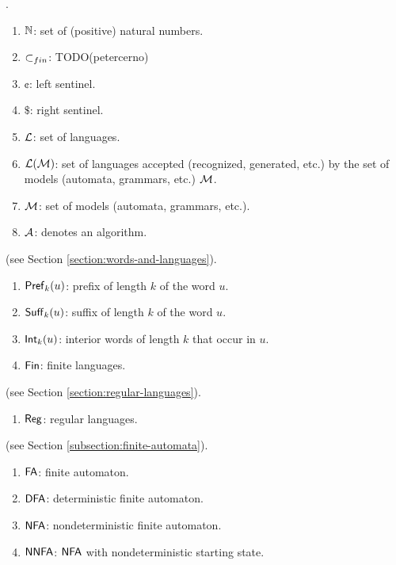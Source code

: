
.

\begin{enumerate}[]
\item $\mathbb{N}$: set of (positive) natural numbers.
\item $\subset_{fin}$: TODO(petercerno)
\item $\cent$: left sentinel.
\item $\$$: right sentinel.
\item $\textup{\sf $\mathcal{L}$}$: set of languages.
\item ${\cal L}(\textup{\sf $\mathcal{M}$})$: set of languages accepted (recognized, generated, etc.) by the set of models (automata, grammars, etc.) $\textup{\sf $\mathcal{M}$}$.
\item $\textup{\sf $\mathcal{M}$}$: set of models (automata, grammars, etc.).
\item $\textup{\sf $\mathcal{A}$}$: denotes an algorithm.
\end{enumerate}

 (see Section \ref{section:words-and-languages}).

\begin{enumerate}[]
\item $\textup{\sf Pref\/}_k(u)$: prefix of length $k$ of the word $u$.
\item $\textup{\sf Suff\/}_k(u)$: suffix of length $k$ of the word $u$.
\item $\textup{\sf Int\/}_k(u)$: interior words of length $k$ that occur in $u$.
\item $\textup{\sf Fin}$: finite languages.
\end{enumerate}

 (see Section \ref{section:regular-languages}).

\begin{enumerate}[]
\item $\textup{\sf Reg}$: regular languages.
\end{enumerate}

 (see Section \ref{subsection:finite-automata}).

\begin{enumerate}[]
\item $\textup{\sf FA}$: finite automaton.
\item $\textup{\sf DFA}$: deterministic finite automaton.
\item $\textup{\sf NFA}$: nondeterministic finite automaton.
\item $\textup{\sf NNFA}$: $\textup{\sf NFA}$ with nondeterministic starting state.
\end{enumerate}

